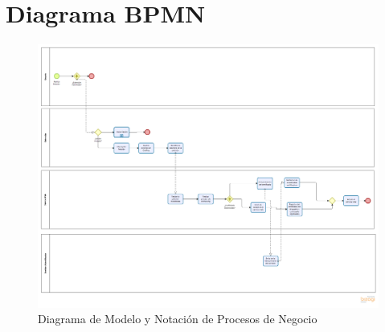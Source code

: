 \documentclass[12pt, a4paper, titlepage]{report}
\begin{document}
    	
    	\section{Diagrama BPMN}
        	\begin{figure}[H]
            		\begin{center}
            		\includegraphics[width=14cm]{./imagenes/Analisis/BPMN.png}
            		\caption{Diagrama de Modelo y Notación de Procesos de Negocio}
    	            \end{center}
    	    \end{figure}   
    	    
\end{document}
